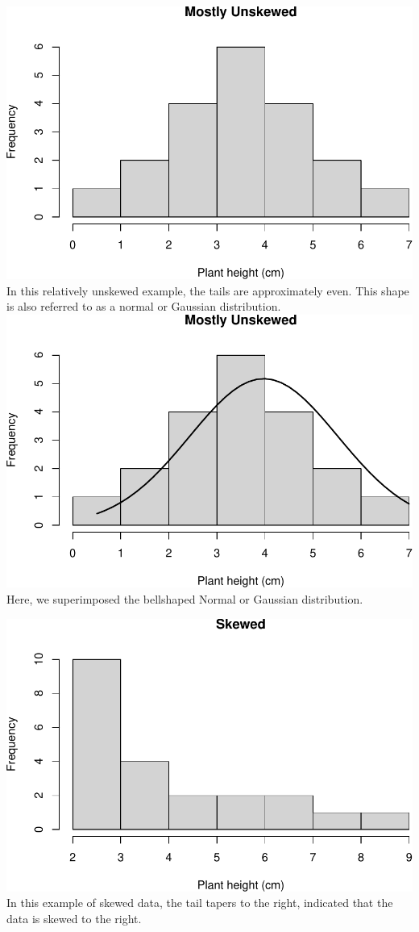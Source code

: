 \documentclass[
]{book}
\begin{document}
\includegraphics{_main_files/figure-latex/unnamed-chunk-10-1.pdf}
In this relatively unskewed example, the tails are approximately even. This shape is also referred to as a normal or Gaussian distribution.
\includegraphics{_main_files/figure-latex/unnamed-chunk-11-1.pdf}
Here, we superimposed the bellshaped Normal or Gaussian distribution.

\includegraphics{_main_files/figure-latex/unnamed-chunk-12-1.pdf}
In this example of skewed data, the tail tapers to the right, indicated that the data is skewed to the right.
\end{document}
